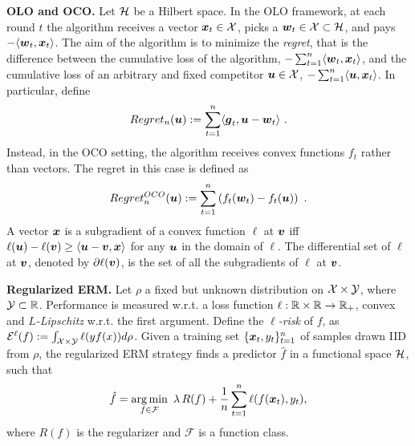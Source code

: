 \vspace{0.2cm}\noindent\textbf{\ac{OLO} and \ac{OCO}.}
Let $\mathcal{H}$ be a Hilbert space. In the \ac{OLO} framework, at each round $t$ the algorithm receives a vector $\boldsymbol{x}_t \in \mathcal{X}$, picks a $\boldsymbol{w}_t \in \mathcal{X} \subset \mathcal{H}$, and pays $-\langle \boldsymbol{w}_t,\boldsymbol{x}_t \rangle$.
The aim of the algorithm is to minimize the \emph{regret}, that is the difference between the cumulative loss of the algorithm, $-\sum_{t=1}^n \langle \boldsymbol{w}_t,\boldsymbol{x}_t \rangle$, and the cumulative loss of an arbitrary and fixed competitor $\boldsymbol{u} \in \mathcal{X}$, $-\sum_{t=1}^n \langle \boldsymbol{u},\boldsymbol{x}_t \rangle$.
In particular, define
\[
Regret_n(\boldsymbol{u}) := \sum_{t=1}^n \langle \boldsymbol{g}_t , \boldsymbol{u} - \boldsymbol{w}_t \rangle~.
\]
Instead, in the \ac{OCO} setting, the algorithm receives convex functions $f_t$ rather than vectors.
The regret in this case is defined as
\[
Regret^{OCO}_n(\boldsymbol{u}) := \sum_{t=1}^n \left(f_t(\boldsymbol{w}_t) -f_t(\boldsymbol{u})\right)~.
\]
A vector $\boldsymbol{x}$ is a subgradient of a convex function $\ell$ at $\boldsymbol{v}$ iff $\ell(\boldsymbol{u}) - \ell(\boldsymbol{v}) \ge \langle \boldsymbol{u} - \boldsymbol{v}, \boldsymbol{x} \rangle$ for any $\boldsymbol{u}$ in the domain of $\ell$. The differential set of $\ell$ at $\boldsymbol{v}$, denoted by $\partial \ell(\boldsymbol{v})$, is the set of all the subgradients of $\ell$ at $\boldsymbol{v}$.

\vspace{0.2cm}\noindent\textbf{Regularized ERM.}
Let $\rho$ a fixed but unknown distribution on $\mathcal{X} \times \mathcal{Y}$, where $\mathcal{Y} \subset \mathbb{R}$.
Performance is measured w.r.t. a loss function $\ell: \mathbb{R} \times \mathbb{R} \rightarrow \mathbb{R}_+$, convex and \emph{$L$-Lipschitz} w.r.t. the first argument.
Define the \emph{$\ell$-risk} of $f$, as $\mathcal{E}^{\ell}(f):=\int_{\mathcal{X} \times \mathcal{Y}} \ell(y f(x)) d \rho$.
Given a training set $\{\boldsymbol{x}_t,y_t\}_{t=1}^n$ of samples drawn \ac{IID} from $\rho$, the regularized \ac{ERM} strategy finds a predictor $\hat{f}$ in a functional space $\mathcal{H}$, such that
\[
\hat{f}= \argmin_{f \in \mathcal{F}} \ \lambda\, R(f) + \frac{1}{n} \sum_{t=1}^n \ell(f(\bx_t),y_t),
\]
where $R(f)$ is the regularizer and $\mathcal{F}$ is a function class.